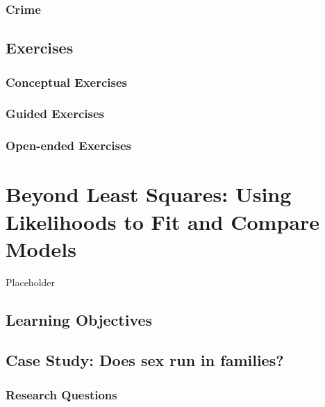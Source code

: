 \documentclass[
]{krantz}
\begin{document}
\hypertarget{crime}{%
\subsection{Crime}\label{crime}}

\hypertarget{exercises}{%
\section{Exercises}\label{exercises}}

\hypertarget{conceptual-exercises}{%
\subsection{Conceptual Exercises}\label{conceptual-exercises}}

\hypertarget{guided-exercises}{%
\subsection{Guided Exercises}\label{guided-exercises}}

\hypertarget{open-ended-exercises}{%
\subsection{Open-ended Exercises}\label{open-ended-exercises}}

\hypertarget{ch-beyondmost}{%
\chapter{Beyond Least Squares: Using Likelihoods to Fit and Compare Models}\label{ch-beyondmost}}

Placeholder

\hypertarget{learning-objectives-1}{%
\section{Learning Objectives}\label{learning-objectives-1}}

\hypertarget{case-study-does-sex-run-in-families}{%
\section{Case Study: Does sex run in families?}\label{case-study-does-sex-run-in-families}}

\hypertarget{research-questions}{%
\subsection{Research Questions}\label{research-questions}}
\end{document}
